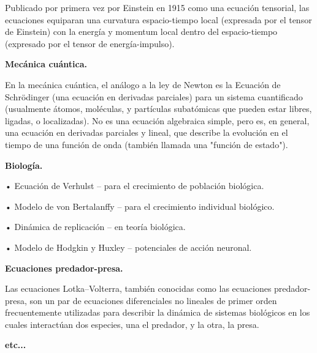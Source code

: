 \textcolor{gris}{Publicado por primera vez por Einstein en 1915 como una ecuación tensorial, las ecuaciones equiparan una curvatura espacio-tiempo local (expresada por el tensor de Einstein) con la energía y momentum local dentro del espacio-tiempo (expresado por el tensor de energía-impulso).}

\textcolor{gris}{\textbf{Mecánica cuántica.}}

\textcolor{gris}{En la mecánica cuántica, el análogo a la ley de Newton es la Ecuación de Schrödinger (una ecuación en derivadas parciales) para un sistema cuantificado (usualmente átomos, moléculas, y partículas subatómicas que pueden estar libres, ligadas, o localizadas). No es una ecuación algebraica simple, pero es, en general, una ecuación en derivadas parciales y lineal, que describe la evolución en el tiempo de una función de onda (también llamada una "función de estado").}

\textcolor{gris}{\textbf{Biología.}}
 
\textcolor{gris}{•	Ecuación de Verhulst – para el crecimiento de población biológica.}
 
\textcolor{gris}{•	Modelo de von Bertalanffy – para el crecimiento individual biológico.}
 
\textcolor{gris}{•	Dinámica de replicación – en teoría biológica.}
 
\textcolor{gris}{•	Modelo de Hodgkin y Huxley – potenciales de acción neuronal.}
	
\textcolor{gris}{\textbf{Ecuaciones predador-presa.}}

\textcolor{gris}{Las ecuaciones Lotka–Volterra, también conocidas como las ecuaciones predador-presa, son un par de ecuaciones diferenciales no lineales de primer orden frecuentemente utilizadas para describir la dinámica de sistemas biológicos en los cuales interactúan dos especies, una el predador, y la otra, la presa. }

\textcolor{gris}{\textbf{etc...}}




	